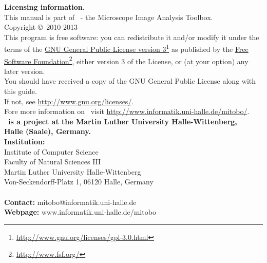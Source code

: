 \documentclass[11pt,a4paper,english]{report}
\begin{document}
\newpage
\thispagestyle{empty}
\parindent0pt
{\large \textbf{Licensing information.}}\\[0.5cm]
This manual is part of \mitobo\ - the Microscope Image Analysis
Toolbox.\\[0.5cm]
Copyright \copyright\ 2010-2013\\[0.5cm]
This program is free software: you can redistribute it and/or modify
it under the terms of the \href{http://www.gnu.org/licenses/gpl-3.0.html}{GNU
General Public License
version
3}\footnote{\href{http://www.gnu.org/licenses/gpl-3.0.html}{http://www.gnu.org/licenses/gpl-3.0.html}}
as published by the \href{http://www.fsf.org/}{Free Software
Foundation}\footnote{\href{http://www.fsf.org/}{http://www.fsf.org/}}, either
version 3 of the License, or (at your option) any later version.\\ 
You should have received a copy of the GNU General Public License along with this guide.\\
If not,
see \href{http://www.gnu.org/licenses/}{http://www.gnu.org/licenses/}.\\[1.0cm]
Fore more information on \mitobo\ visit
\href{http://www.informatik.uni-halle.de/mitobo/}{
http://www.informatik.uni-halle.de/mitobo/}.\\[5.0cm] 

{\large \textbf{\mitobo\ is a project at the Martin Luther University
Halle-Wittenberg, \\ Halle (Saale), Germany.}}\\[0.5cm]

\textbf{Institution:}\\[0.5cm]
Institute of Computer Science\\
Faculty of Natural Sciences III\\
Martin Luther University Halle-Wittenberg\\
Von-Seckendorff-Platz 1, 06120 Halle, Germany\\\\
\textbf{Contact:} mitobo@informatik.uni-halle.de\\
\textbf{Webpage:} www.informatik.uni-halle.de/mitobo
\parindent20pt
\newpage
{}


\tableofcontents




\end{document}
